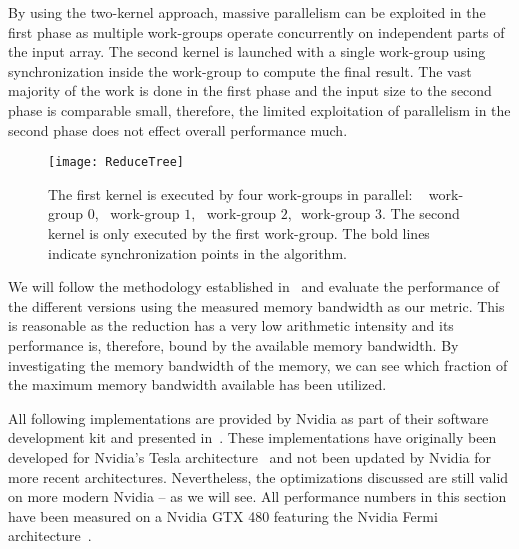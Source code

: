 By using the two-kernel approach, massive parallelism can be exploited in the first phase as multiple work-groups operate concurrently on independent parts of the input array.
The second kernel is launched with a single work-group using synchronization inside the work-group to compute the final result.
The vast majority of the work is done in the first phase and the input size to the second phase is comparable small, therefore, the limited exploitation of parallelism in the second phase does not effect overall performance much.

\begin{figure}[t]
  \centering
  \texttt{[image: ReduceTree]}
  \caption[Parallel Reduction in \OpenCL.]%
    {The first \OpenCL kernel is executed by four work-groups in parallel:
    \ \protect\firstBox{}\,\,work-group $0$,\ \protect\secondBox{}\,\,work-group $1$,\ \protect\thirdBox{}\,\,work-group $2$, \protect\fourthBox{}\,\,work-group $3$.
           The second \OpenCL kernel is only executed by the first work-group. The bold lines indicate synchronization points in the algorithm.}
  \label{fig:reduce:tree}
\end{figure}

We will follow the methodology established in~\cite{Harris2007} and evaluate the performance of the different versions using the measured \GPU memory bandwidth as our metric.
This is reasonable as the reduction has a very low arithmetic intensity and its performance is, therefore, bound by the available \GPU memory bandwidth.
By investigating the memory bandwidth of the \GPU memory, we can see which fraction of the maximum memory bandwidth available has been utilized.

All following implementations are provided by Nvidia as part of their software development kit and presented in~\cite{Harris2007}.
These implementations have originally been developed for Nvidia's Tesla \GPU architecture~\cite{LindholmNOM2008} and not been updated by Nvidia for more recent \GPU architectures.
Nevertheless, the optimizations discussed are still valid on more modern Nvidia \GPUs -- as we will see.
All performance numbers in this section have been measured on a Nvidia GTX 480 \GPU featuring the Nvidia Fermi architecture~\cite{CUDAFermi2009}.

\newpage

